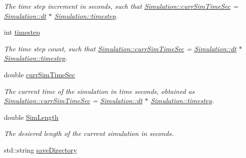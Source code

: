 \begin{DoxyCompactItemize}
\begin{DoxyCompactList}\small\item\em The time step increment in seconds, such that \hyperlink{classSimulation_a0a8d61383b2f51f2f98b72554b7e00cb}{Simulation\+::curr\+Sim\+Time\+Sec} = \hyperlink{classSimulation_a0ee381efb3458d02bf78487cbb4dc42a}{Simulation\+::dt} $\ast$ \hyperlink{classSimulation_a2056af9924aff237c804ffe006adc00b}{Simulation\+::timestep}. \end{DoxyCompactList}\item 
\hypertarget{classSimulation_a2056af9924aff237c804ffe006adc00b}{}int \hyperlink{classSimulation_a2056af9924aff237c804ffe006adc00b}{timestep}\label{classSimulation_a2056af9924aff237c804ffe006adc00b}

\begin{DoxyCompactList}\small\item\em The time step count, such that \hyperlink{classSimulation_a0a8d61383b2f51f2f98b72554b7e00cb}{Simulation\+::curr\+Sim\+Time\+Sec} = \hyperlink{classSimulation_a0ee381efb3458d02bf78487cbb4dc42a}{Simulation\+::dt} $\ast$ \hyperlink{classSimulation_a2056af9924aff237c804ffe006adc00b}{Simulation\+::timestep}. \end{DoxyCompactList}\item 
\hypertarget{classSimulation_a0a8d61383b2f51f2f98b72554b7e00cb}{}double \hyperlink{classSimulation_a0a8d61383b2f51f2f98b72554b7e00cb}{curr\+Sim\+Time\+Sec}\label{classSimulation_a0a8d61383b2f51f2f98b72554b7e00cb}

\begin{DoxyCompactList}\small\item\em The current time of the simulation in time seconds, obtained as \hyperlink{classSimulation_a0a8d61383b2f51f2f98b72554b7e00cb}{Simulation\+::curr\+Sim\+Time\+Sec} = \hyperlink{classSimulation_a0ee381efb3458d02bf78487cbb4dc42a}{Simulation\+::dt} $\ast$ \hyperlink{classSimulation_a2056af9924aff237c804ffe006adc00b}{Simulation\+::timestep}. \end{DoxyCompactList}\item 
\hypertarget{classSimulation_a96bf105b28395184053bb4f987f05746}{}double \hyperlink{classSimulation_a96bf105b28395184053bb4f987f05746}{Sim\+Length}\label{classSimulation_a96bf105b28395184053bb4f987f05746}

\begin{DoxyCompactList}\small\item\em The desiered length of the current simulation in seconds. \end{DoxyCompactList}\item 
\hypertarget{classSimulation_a9e4287e16564745895acac3550e11e82}{}std\+::string \hyperlink{classSimulation_a9e4287e16564745895acac3550e11e82}{save\+Directory}\label{classSimulation_a9e4287e16564745895acac3550e11e82}


\end{DoxyCompactItemize}
